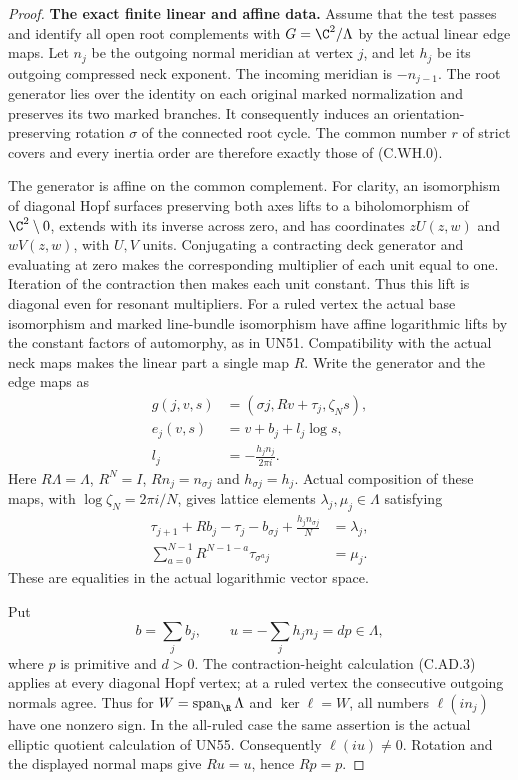 \begin{proof}
\par\medskip\noindent\textbf{The exact finite linear and affine data.}
Assume that the test passes and identify all open root
complements with $G=\C^2/\Lambda$ by the actual linear
edge maps. Let $n_j$ be the outgoing normal meridian at
vertex $j$, and let $h_j$ be its outgoing compressed
neck exponent. The incoming meridian is $-n_{j-1}$.
The root generator lies over the identity on each original
marked normalization and preserves its two marked branches.
It consequently induces an orientation-preserving rotation
$\sigma$ of the connected root cycle. The common number
$r$ of strict covers and every inertia order are therefore
exactly those of (C.WH.0).

The generator is affine on the common complement. For clarity,
an isomorphism of diagonal Hopf surfaces preserving both axes
lifts to a biholomorphism of $\C^2\setminus0$, extends with
its inverse across zero, and has coordinates $zU(z,w)$ and
$wV(z,w)$, with $U,V$ units. Conjugating a contracting deck
generator and evaluating at zero makes the corresponding
multiplier of each unit equal to one. Iteration of the
contraction then makes each unit constant. Thus this lift
is diagonal even for resonant multipliers. For a ruled
vertex the actual base isomorphism and marked line-bundle
isomorphism have affine logarithmic lifts by the constant
factors of automorphy, as in UN51. Compatibility with the
actual neck maps makes the linear part a single map $R$.
Write the generator and the edge maps as
\[
 \begin{aligned}
 g(j,v,s)&=(\sigma j,Rv+\tau_j,\zeta_Ns),\\
 e_j(v,s)&=v+b_j+l_j\log s,\\
 l_j&=-\frac{h_j n_j}{2\pi i}.
 \end{aligned}
\tag{C.EW.2}
\]
Here $R\Lambda=\Lambda$, $R^N=I$,
$Rn_j=n_{\sigma j}$ and $h_{\sigma j}=h_j$.
Actual composition of these maps, with
$\log\zeta_N=2\pi i/N$, gives lattice elements
$\lambda_j,\mu_j\in\Lambda$ satisfying
\[
 \begin{aligned}
 \tau_{j+1}+Rb_j-\tau_j-b_{\sigma j}
             +\frac{h_j n_{\sigma j}}N&=\lambda_j,\\
 \sum_{a=0}^{N-1}R^{N-1-a}\tau_{\sigma^a j}&=\mu_j.
 \end{aligned}
\tag{C.EW.3}
\]
These are equalities in the actual logarithmic vector space.

Put
\[
             b=\sum_jb_j,\qquad
             u=-\sum_jh_jn_j=d p\in\Lambda,
\tag{C.EW.4}
\]
where $p$ is primitive and $d>0$. The contraction-height
calculation (C.AD.3) applies at every diagonal Hopf vertex;
at a ruled vertex the consecutive outgoing normals agree.
Thus for $W=\operatorname{span}_{\R}\Lambda$ and
$\ker\ell=W$, all numbers $\ell(i n_j)$ have one
nonzero sign. In the all-ruled case the same assertion
is the actual elliptic quotient calculation of UN55.
Consequently $\ell(iu)\ne0$. Rotation and the displayed
normal maps give $Ru=u$, hence $Rp=p$.


\end{proof}
